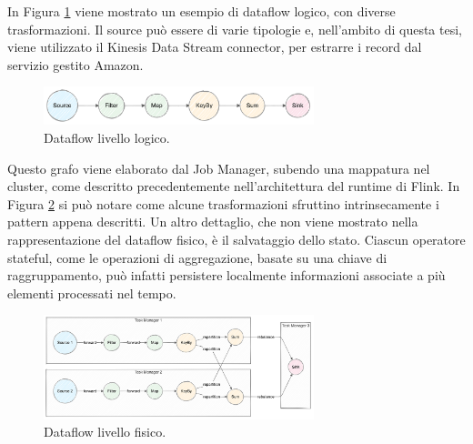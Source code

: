 In Figura \ref{fig:dataflow-l} viene mostrato un esempio di dataflow logico, con diverse trasformazioni. Il source può essere di varie tipologie e, nell'ambito di questa tesi, viene utilizzato il Kinesis Data Stream connector, per estrarre i record dal servizio gestito Amazon. %

\begin{figure}[htbp]
    \centering
    \includegraphics[width=0.7\textwidth]{figures/logical-dag.png}
    \caption{Dataflow livello logico.}
    \label{fig:dataflow-l}
\end{figure}  

Questo grafo viene elaborato dal Job Manager, subendo una mappatura nel cluster, come descritto precedentemente nell'architettura del runtime di Flink. In Figura \ref{fig:dataflow-phy} si può notare come alcune trasformazioni sfruttino intrinsecamente i pattern appena descritti. %
Un altro dettaglio, che non viene mostrato nella rappresentazione del dataflow fisico, è il salvataggio dello stato. Ciascun operatore stateful, come le operazioni di aggregazione, basate su una chiave di raggruppamento, può infatti persistere localmente informazioni associate a più elementi processati nel tempo. %


\begin{figure}[htbp]
    \centering
    \includegraphics[width=0.7\textwidth]{figures/physical-dataflow-example.png}
    \caption{Dataflow livello fisico.}
    \label{fig:dataflow-phy}
\end{figure}  


